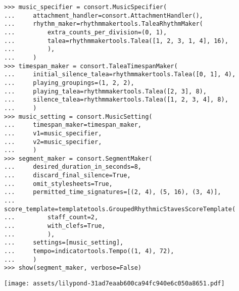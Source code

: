 \begin{comment}
<abjad>[stylesheet=../consort.ily]
music_specifier = consort.MusicSpecifier(
    attachment_handler=consort.AttachmentHandler(),
    rhythm_maker=rhythmmakertools.TaleaRhythmMaker(
        extra_counts_per_division=(0, 1),
        talea=rhythmmakertools.Talea([1, 2, 3, 1, 4], 16),
        ),
    )
timespan_maker = consort.TaleaTimespanMaker(
    initial_silence_talea=rhythmmakertools.Talea([0, 1], 4),
    playing_groupings=(1, 2, 2),
    playing_talea=rhythmmakertools.Talea([2, 3], 8),
    silence_talea=rhythmmakertools.Talea([1, 2, 3, 4], 8),
    )
music_setting = consort.MusicSetting(
    timespan_maker=timespan_maker,
    v1=music_specifier,
    v2=music_specifier,
    )
segment_maker = consort.SegmentMaker(
    desired_duration_in_seconds=8,
    discard_final_silence=True,
    omit_stylesheets=True,
    permitted_time_signatures=[(2, 4), (5, 16), (3, 4)],
    score_template=templatetools.GroupedRhythmicStavesScoreTemplate(
        staff_count=2,
        with_clefs=True,
        ),
    settings=[music_setting],
    tempo=indicatortools.Tempo((1, 4), 72),
    )
show(segment_maker, verbose=False)
</abjad>
\end{comment}

\begin{singlespacing}
\vspace{-0.5\baselineskip}
\begin{lstlisting}
>>> music_specifier = consort.MusicSpecifier(
...     attachment_handler=consort.AttachmentHandler(),
...     rhythm_maker=rhythmmakertools.TaleaRhythmMaker(
...         extra_counts_per_division=(0, 1),
...         talea=rhythmmakertools.Talea([1, 2, 3, 1, 4], 16),
...         ),
...     )
>>> timespan_maker = consort.TaleaTimespanMaker(
...     initial_silence_talea=rhythmmakertools.Talea([0, 1], 4),
...     playing_groupings=(1, 2, 2),
...     playing_talea=rhythmmakertools.Talea([2, 3], 8),
...     silence_talea=rhythmmakertools.Talea([1, 2, 3, 4], 8),
...     )
>>> music_setting = consort.MusicSetting(
...     timespan_maker=timespan_maker,
...     v1=music_specifier,
...     v2=music_specifier,
...     )
>>> segment_maker = consort.SegmentMaker(
...     desired_duration_in_seconds=8,
...     discard_final_silence=True,
...     omit_stylesheets=True,
...     permitted_time_signatures=[(2, 4), (5, 16), (3, 4)],
...     score_template=templatetools.GroupedRhythmicStavesScoreTemplate(
...         staff_count=2,
...         with_clefs=True,
...         ),
...     settings=[music_setting],
...     tempo=indicatortools.Tempo((1, 4), 72),
...     )
>>> show(segment_maker, verbose=False)
\end{lstlisting}
\noindent\texttt{[image: assets/lilypond-31ad7eaab600ca94fc940e6c050a8651.pdf]}
\end{singlespacing}

